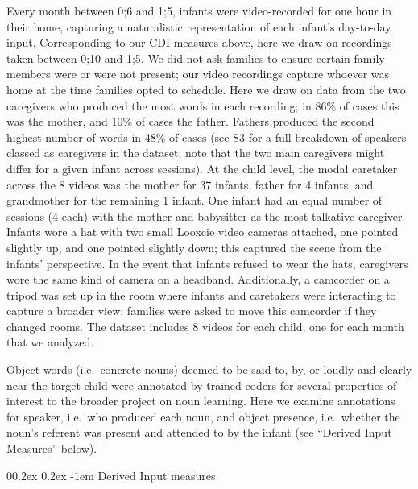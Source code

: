 \documentclass[
  man,mask,floatsintext]{apa6}
\makeatletter
\let\oldparagraph\paragraph
\renewcommand{\paragraph}[1]{\oldparagraph{#1}\mbox{}}
\renewcommand{\paragraph}{\@startsection{paragraph}{4}{\parindent}%
  {0\baselineskip \@plus 0.2ex \@minus 0.2ex}%
  {-1em}%
  {\normalfont\normalsize\bfseries\itshape\typesectitle}}
\makeatother
\begin{document}
Every month between 0;6 and 1;5, infants were video-recorded for one hour in their home, capturing a naturalistic representation of each infant's day-to-day input. Corresponding to our CDI measures above, here we draw on recordings taken between 0;10 and 1;5. We did not ask families to ensure certain family members were or were not present; our video recordings capture whoever was home at the time families opted to schedule. Here we draw on data from the two caregivers who produced the most words in each recording; in 86\% of cases this was the mother, and 10\% of cases the father. Fathers produced the second highest number of words in 48\% of cases (see S3 for a full breakdown of speakers classed as caregivers in the dataset; note that the two main caregivers might differ for a given infant across sessions). At the child level, the modal caretaker across the 8 videos was the mother for 37 infants, father for 4 infants, and grandmother for the remaining 1 infant. One infant had an equal number of sessions (4 each) with the mother and babysitter as the most talkative caregiver. Infants wore a hat with two small Looxcie video cameras attached, one pointed slightly up, and one pointed slightly down; this captured the scene from the infants' perspective. In the event that infants refused to wear the hats, caregivers wore the same kind of camera on a headband. Additionally, a camcorder on a tripod was set up in the room where infants and caretakers were interacting to capture a broader view; families were asked to move this camcorder if they changed rooms. The dataset includes 8 videos for each child, one for each month that we analyzed.

Object words (i.e.~concrete nouns) deemed to be said to, by, or loudly and clearly near the target child were annotated by trained coders for several properties of interest to the broader project on noun learning. Here we examine annotations for speaker, i.e.~who produced each noun, and object presence, i.e.~whether the noun's referent was present and attended to by the infant (see ``Derived Input Measures'' below).

\hypertarget{derived-input-measures}{%
\paragraph{Derived Input measures}\label{derived-input-measures}}
\end{document}

